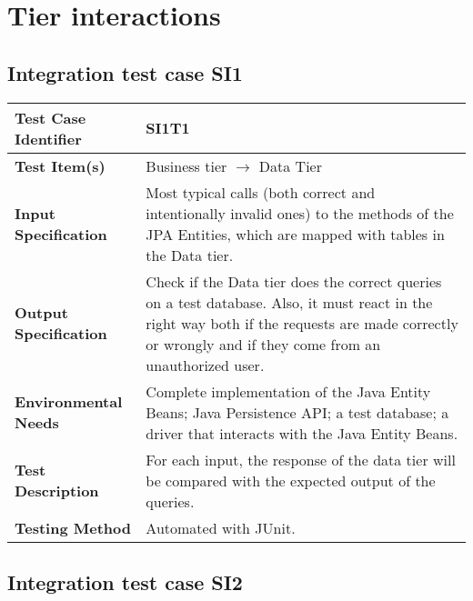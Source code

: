 \section{Tier interactions}
\subsection{Integration test case SI1}

\begin{tabular}{l p{}}
    \hline
    \textbf{Test Case Identifier} & SI1T1\\
    \hline
    \textbf{Test Item(s)} & Business tier $\rightarrow$ Data Tier\\
    \hline
    \textbf{Input Specification} & Most typical calls (both correct and intentionally invalid ones) to the methods of the JPA Entities, which are mapped with tables in the Data tier.\\
    \hline
    \textbf{Output Specification} & Check if the Data tier does the correct queries on a test database. Also, it must react in the right way both if the requests are made correctly or wrongly and if they come from an unauthorized user.\\
    \hline
    \textbf{Environmental Needs} & Complete implementation of the Java Entity Beans; Java Persistence API; a test database; a driver that interacts with the Java Entity Beans. \\
    \hline
    \textbf{Test Description} & For each input, the response of the data tier will be compared with the expected output of the queries.\\
    \hline
    \textbf{Testing Method} & Automated with JUnit.\\
    \hline
\end{tabular}

\vspace{2em}

\subsection{Integration test case SI2}
\label{sec:performance-business}

